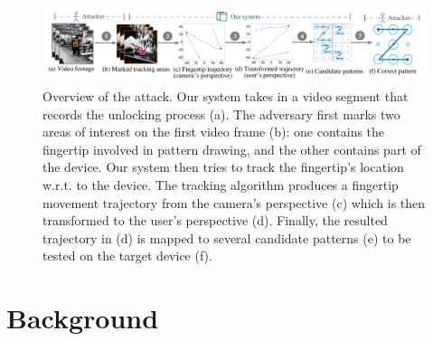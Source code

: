 \begin{figure}[!ht]
    \centering
    \includegraphics[width=\textwidth]{fig/overview.pdf}
    \vspace{-4mm}
    \caption{Overview of the attack.
     Our system takes in a video segment that records the unlocking process (a). The adversary first marks two areas of interest on the first video frame (b): one contains the fingertip involved in pattern drawing, and the other contains part of the device. Our system then tries to track the fingertip's location w.r.t. to the device.
     The tracking algorithm produces a fingertip movement trajectory from the camera's perspective (c) which is then transformed to the user's perspective (d). Finally, the resulted trajectory in (d) is mapped to several candidate patterns (e) to be tested on the target device (f). }
    \label{fig:fig2}
    \vspace{-3mm}
\end{figure}

\section{Background}
